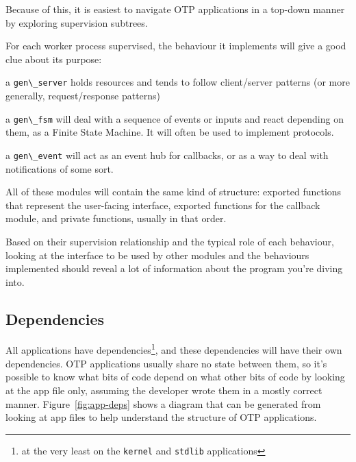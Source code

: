 \documentclass[11pt, oneside]{book}   	%
\newcommand{\module}[1]{\Verb`#1`}
\begin{document}
Because of this, it is easiest to navigate OTP applications in a top-down manner by exploring supervision subtrees. 

For each worker process supervised, the behaviour it implements will give a good clue about its purpose:

\begin{itemize*}
	\item a \module{gen\_server} holds resources and tends to follow client/server patterns (or more generally, request/response patterns)
	\item a \module{gen\_fsm} will deal with a sequence of events or inputs and react depending on them, as a Finite State Machine. It will often be used to implement protocols.
	\item a \module{gen\_event} will act as an event hub for callbacks, or as a way to deal with notifications of some sort.
\end{itemize*}

All of these modules will contain the same kind of structure: exported functions that represent the user-facing interface, exported functions for the callback module, and private functions, usually in that order.

Based on their supervision relationship and the typical role of each behaviour, looking at the interface to be used by other modules and the behaviours implemented should reveal a lot of information about the program you're diving into.

\subsection{Dependencies}
\label{subsec:dive-dependencies}

All applications have dependencies\footnote{at the very least on the \module{kernel} and \module{stdlib} applications}, and these dependencies will have their own dependencies. OTP applications usually share no state between them, so it's possible to know what bits of code depend on what other bits of code by looking at the app file only, assuming the developer wrote them in a mostly correct manner. Figure~\ref{fig:app-deps} shows a diagram that can be generated from looking at app files to help understand the structure of OTP applications.
\end{document}
